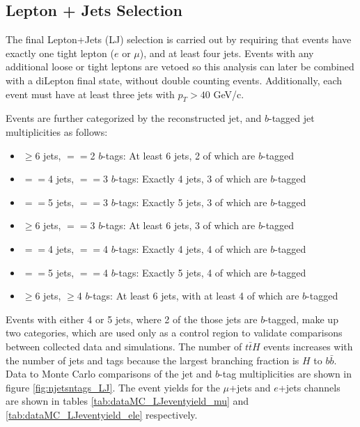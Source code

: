 \subsection{Lepton + Jets Selection}
\label{LJ_selection_overview}

\par The final Lepton+Jets (LJ) selection is carried out by
requiring that events have exactly one tight lepton ($e$ or
$\mu$), and at least four jets. Events with any additional loose or
tight leptons are vetoed so this analysis can later be combined with a
diLepton final state, without double counting events. Additionally,
each event must have at least three jets with $p_{T} > 40$ GeV/c.

\par Events are further categorized by the reconstructed jet, and
$b$-tagged jet multiplicities as follows:

\begin{itemize}
  \item $\ge$6 jets,  $==$2 $b$-tags: At least 6 jets, 2 of which are $b$-tagged 
  \item $==$4 jets, $==$3 $b$-tags: Exactly 4 jets, 3 of which are $b$-tagged 
  \item $==$5 jets, $==$3 $b$-tags: Exactly 5 jets, 3 of which are $b$-tagged 
  \item $\ge$6 jets, $==$3 $b$-tags: At least 6 jets, 3 of which are $b$-tagged 
  \item $==$4 jets, $==$4 $b$-tags: Exactly 4 jets, 4 of which are $b$-tagged 
  \item $==$5 jets, $==$4 $b$-tags: Exactly 5 jets, 4 of which are $b$-tagged 
  \item $\ge$6 jets, $\ge$4 $b$-tags: At least 6 jets, with at least 4 of which are $b$-tagged 
\end{itemize}

\noindent Events with either 4 or 5 jets, where 2 of the those jets
are $b$-tagged, make up two categories, which are used only as a
control region to validate comparisons between collected data and
simulations.  The number of $t\bar{t}H$ events increases with the
number of jets and tags because the largest branching fraction is $H$
to $b\bar{b}$.  Data to Monte Carlo comparisons of the jet and $b$-tag
multiplicities are shown in figure \ref{fig:njetsntags_LJ}.  The event
yields for the $\mu$+jets and $e$+jets channels are shown in tables
\ref{tab:dataMC_LJeventyield_mu} and \ref{tab:dataMC_LJeventyield_ele}
respectively. 

